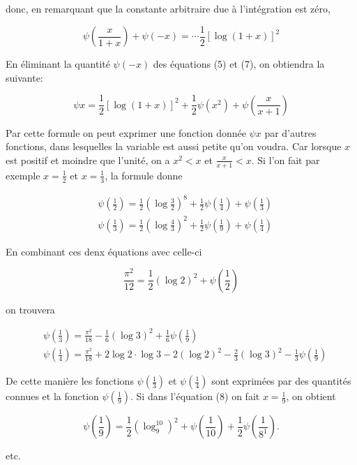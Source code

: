 \documentclass{article}
\begin{document}
donc, en remarquant que la constante arbitraire due à l'intégration est zéro,

\[
\psi\left(\frac{x}{1+x}\right)+\psi(-x)=\cdots \frac{1}{2}[\log (1+x)]^{2}
\]

En éliminant la quantité \(\psi(-x)\) des équations (5) et (7), on obtiendra la suivante:

\[
\psi x=\frac{1}{2}[\log (1+x)]^{2}+\frac{1}{2} \psi\left(x^{2}\right)+\psi\left(\frac{x}{x+1}\right)
\]

Par cette formule on peut exprimer une fonction donnée \(\psi x\) par d'autres fonctions, dans lesquelles la variable est aussi petite qu'on voudra. Car lorsque \(x\) est positif et moindre que l'unité, on a \(x^{2}<x\) et \(\frac{x}{x+1}<x\). Si l'on fait par exemple \(x=\frac{1}{2}\) et \(x=\frac{1}{3}\), la formule donne

\[
\begin{aligned}
& \psi\left(\frac{1}{2}\right)=\frac{1}{2}\left(\log \frac{3}{2}\right)^{8}+\frac{1}{2} \psi\left(\frac{1}{4}\right)+\psi\left(\frac{1}{3}\right) \\
& \psi\left(\frac{1}{3}\right)=\frac{1}{2}\left(\log \frac{4}{3}\right)^{2}+\frac{1}{2} \psi\left(\frac{1}{9}\right)+\psi\left(\frac{1}{4}\right)
\end{aligned}
\]

En combinant ces denx équations avec celle-ci

\[
\frac{\pi^{2}}{12}=\frac{1}{2}(\log 2)^{2}+\psi\left(\frac{1}{2}\right)
\]

on trouvera

\[
\begin{aligned}
& \psi\left(\frac{1}{3}\right)=\frac{\pi^{2}}{18}-\frac{1}{6}(\log 3)^{2}+\frac{1}{6} \psi\left(\frac{1}{9}\right) \\
& \psi\left(\frac{1}{4}\right)=\frac{\pi^{2}}{18}+2 \log 2 \cdot \log 3-2(\log 2)^{2}-\frac{2}{3}(\log 3)^{2}-\frac{1}{3} \psi\left(\frac{1}{9}\right)
\end{aligned}
\]

De cette manière les fonctions \(\psi\left(\frac{1}{3}\right)\) et \(\psi\left(\frac{1}{4}\right)\) sont exprimées par des quantités connues et la fonction \(\psi\left(\frac{1}{9}\right)\). Si dans l'équation (8) on fait \(x=\frac{1}{9}\), on obtient

\[
\psi\left(\frac{1}{9}\right)=\frac{1}{2}\left(\log _{9}^{10}\right)^{2}+\psi\left(\frac{1}{10}\right)+\frac{1}{2} \psi\left(\frac{1}{8^{1}}\right) .
\]

etc.
\end{document}

